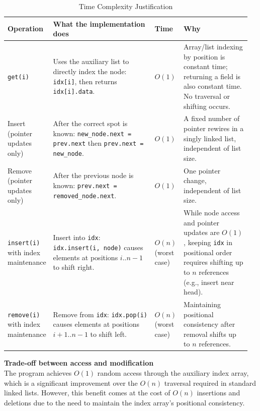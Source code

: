 \documentclass[12pt]{article}
\begin{document}
\begin{table}[h]
\centering
\begin{tabularx}{\linewidth}{@{}>{\raggedright\arraybackslash}p{0.14\linewidth}
                            >{\raggedright\arraybackslash}p{0.45\linewidth}
                            >{\raggedright\arraybackslash}p{0.07\linewidth}
                            >{\raggedright\arraybackslash}p{0.30\linewidth}@{}}
\toprule
\textbf{Operation} & \textbf{What the implementation does} & \textbf{Time} & \textbf{Why} \\
\midrule
\texttt{get(i)} &
Uses the auxiliary list to directly index the node: \texttt{idx[i]}, then returns \texttt{idx[i].data}. &
$O(1)$ &
Array/list indexing by position is constant time; returning a field is also constant time. No traversal or shifting occurs. \\
\addlinespace
Insert (pointer updates only) &
After the correct spot is known: \texttt{new\_node.next = prev.next} then \texttt{prev.next = new\_node}. &
$O(1)$ &
A fixed number of pointer rewires in a singly linked list, independent of list size. \\
\addlinespace
Remove (pointer updates only) &
After the previous node is known: \texttt{prev.next = removed\_node.next}. &
$O(1)$ &
One pointer change, independent of list size. \\
\addlinespace
\texttt{insert(i)} with index maintenance &
Insert into \texttt{idx}: \texttt{idx.insert(i, node)} causes elements at positions $i..n-1$ to shift right. &
$O(n)$ (worst case) &
While node access and pointer updates are $O(1)$, keeping \texttt{idx} in positional order requires shifting up to $n$ references (e.g., insert near head). \\
\addlinespace
\texttt{remove(i)} with index maintenance &
Remove from \texttt{idx}: \texttt{idx.pop(i)} causes elements at positions $i+1..n-1$ to shift left. &
$O(n)$ (worst case) &
Maintaining positional consistency after removal shifts up to $n$ references. \\
\bottomrule
\end{tabularx}
\caption{Time Complexity Justification}
\end{table}

\newpage
\noindent\textbf{Trade-off between access and modification}\\

The program achieves $O(1)$ random access through the auxiliary index array, which is a significant improvement over the $O(n)$ traversal required in standard linked lists. However, this benefit comes at the cost of $O(n)$ insertions and deletions due to the need to maintain the index array's positional consistency.
\end{document}
